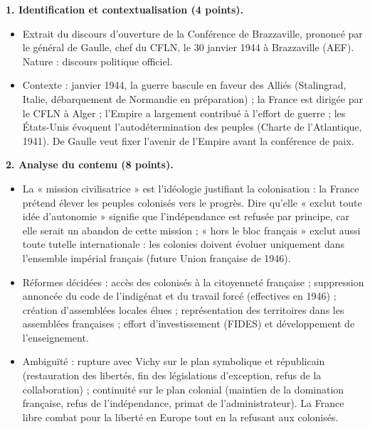 \documentclass[11pt]{article}
\begin{document}
\begin{corrige}
\textbf{1. Identification et contextualisation (4 points).}
\begin{itemize}
\item[a.] Extrait du discours d'ouverture de la Conférence de Brazzaville, prononcé par le général de Gaulle, chef du CFLN, le 30 janvier 1944 à Brazzaville (AEF). Nature : discours politique officiel.
\item[b.] Contexte : janvier 1944, la guerre bascule en faveur des Alliés (Stalingrad, Italie, débarquement de Normandie en préparation) ; la France est dirigée par le CFLN à Alger ; l'Empire a largement contribué à l'effort de guerre ; les États-Unis évoquent l'autodétermination des peuples (Charte de l'Atlantique, 1941). De Gaulle veut fixer l'avenir de l'Empire avant la conférence de paix.
\end{itemize}

\textbf{2. Analyse du contenu (8 points).}
\begin{itemize}
\item[a.] La « mission civilisatrice » est l'idéologie justifiant la colonisation : la France prétend élever les peuples colonisés vers le progrès. Dire qu'elle « exclut toute idée d'autonomie » signifie que l'indépendance est refusée par principe, car elle serait un abandon de cette mission ; « hors le bloc français » exclut aussi toute tutelle internationale : les colonies doivent évoluer uniquement dans l'ensemble impérial français (future Union française de 1946).
\item[b.] Réformes décidées : accès des colonisés à la citoyenneté française ; suppression annoncée du code de l'indigénat et du travail forcé (effectives en 1946) ; création d'assemblées locales élues ; représentation des territoires dans les assemblées françaises ; effort d'investissement (FIDES) et développement de l'enseignement.
\item[c.] Ambiguïté : rupture avec Vichy sur le plan symbolique et républicain (restauration des libertés, fin des législations d'exception, refus de la collaboration) ; continuité sur le plan colonial (maintien de la domination française, refus de l'indépendance, primat de l'administrateur). La France libre combat pour la liberté en Europe tout en la refusant aux colonisés.
\end{itemize}


\end{corrige}
\end{document}
